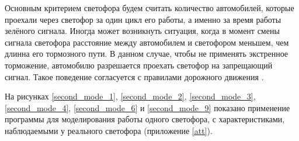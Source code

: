 \documentclass[12pt, a4paper]{extarticle}
\numberwithin{equation}{section}
\numberwithin{figure}{section}
\begin{document}
Основным критерием светофора будем считать количество автомобилей, которые проехали через светофор за один цикл его работы, а именно за время работы зелёного сигнала. Иногда может возникнуть ситуация, когда в момент смены сигнала светофора расстояние между автомобилем и светофором меньшем, чем длинна его тормозного пути. В данном случае, чтобы не применять экстренное торможение, автомобилю разрешается проехать светофор на запрещающий сигнал. Такое поведение согласуется с правилами дорожного движения \cite{PDD}.

На рисунках \ref{second_mode_1}, \ref{second_mode_2}, \ref{second_mode_3}, \ref{second_mode_4}, \ref{second_mode_6} и \ref{second_mode_9} показано применение программы для моделирования работы одного светофора, с характеристиками, наблюдаемыми у реального светофора (приложение \ref{att}).
\end{document}
